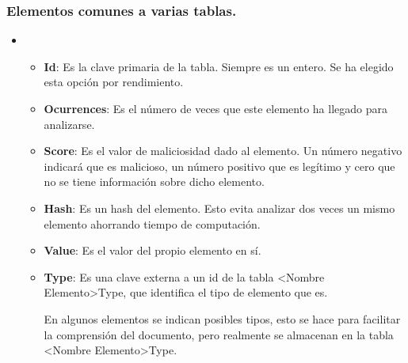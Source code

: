 \subsubsection{Elementos comunes a varias tablas.}
\begin{itemize}
    \item[] 
    \begin{itemize}
        \item \textbf{Id}: Es la clave primaria de la tabla. Siempre es un entero. Se ha elegido esta opción por rendimiento. 
        \item \textbf{Ocurrences}: Es el número de veces que este elemento ha llegado para analizarse.
        \item \textbf{Score}: Es el valor de maliciosidad dado al elemento. Un número negativo indicará que es malicioso, un número positivo que es legítimo y cero que no se tiene información sobre dicho elemento. 
        \item \textbf{Hash}: Es un hash del elemento. Esto evita analizar dos veces un mismo elemento ahorrando tiempo de computación.  
        \item \textbf{Value}: Es el valor del propio elemento en sí.
        \item \textbf{Type}: Es una clave externa a un id de la tabla <Nombre Elemento>Type, que identifica el tipo de elemento que es. 
        
        En algunos elementos se indican posibles tipos, esto se hace para facilitar la comprensión del documento, pero realmente se almacenan en la tabla <Nombre Elemento>Type.
    \end{itemize}
\end{itemize}

